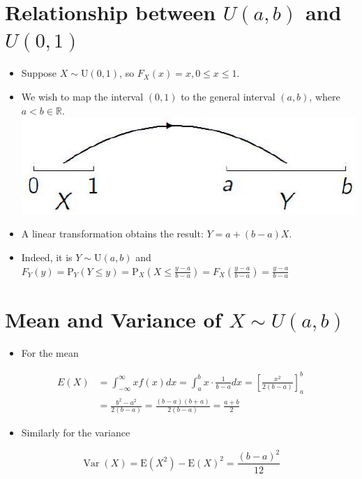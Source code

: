 \documentclass[10pt]{article}
\begin{document}
\section*{Relationship between $U(a, b)$ and $U(0,1)$}
\begin{itemize}
  \item Suppose $X \sim \mathrm{U}(0,1)$, so $F_{X}(x)=x, 0 \leq x \leq 1$.
  \item We wish to map the interval $(0,1)$ to the general interval $(a, b)$, where $a<b \in \mathbb{R}$.\\
\includegraphics[max width=\textwidth, center]{2025_05_11_1201cfe24e14b364b4ecg-20}
  \item A linear transformation obtains the result: $Y=a+(b-a) X$.
  \item Indeed, it is $Y \sim \mathrm{U}(a, b)$ and\\
$F_{Y}(y)=\mathrm{P}_{Y}(Y \leq y)=\mathrm{P}_{X}\left(X \leq \frac{y-a}{b-a}\right)=F_{X}\left(\frac{y-a}{b-a}\right)=\frac{y-a}{b-a}$
\end{itemize}

\section*{Mean and Variance of $X \sim U(a, b)$}
\begin{itemize}
  \item For the mean
\end{itemize}

$$
\begin{aligned}
E(X) & =\int_{-\infty}^{\infty} x f(x) d x=\int_{a}^{b} x \cdot \frac{1}{b-a} d x=\left[\frac{x^{2}}{2(b-a)}\right]_{a}^{b} \\
& =\frac{b^{2}-a^{2}}{2(b-a)}=\frac{(b-a)(b+a)}{2(b-a)}=\frac{a+b}{2}
\end{aligned}
$$

\begin{itemize}
  \item Similarly for the variance
\end{itemize}

$$
\operatorname{Var}(X)=\mathrm{E}\left(X^{2}\right)-\mathrm{E}(X)^{2}=\frac{(b-a)^{2}}{12}
$$
\end{document}
